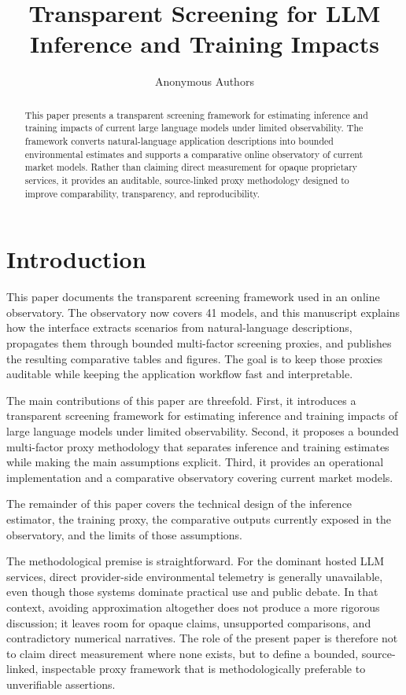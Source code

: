 \documentclass[runningheads]{llncs}
\title{Transparent Screening for LLM Inference and Training Impacts}
\author{Anonymous Authors}
\institute{}
\begin{document}
\maketitle

\begin{abstract}
This paper presents a transparent screening framework for estimating inference and training impacts of current large language models under limited observability. The framework converts natural-language application descriptions into bounded environmental estimates and supports a comparative online observatory of current market models. Rather than claiming direct measurement for opaque proprietary services, it provides an auditable, source-linked proxy methodology designed to improve comparability, transparency, and reproducibility.

\end{abstract}

\section{Introduction}
This paper documents the transparent screening framework used in an online observatory. The observatory now covers 41 models, and this manuscript explains how the interface extracts scenarios from natural-language descriptions, propagates them through bounded multi-factor screening proxies, and publishes the resulting comparative tables and figures. The goal is to keep those proxies auditable while keeping the application workflow fast and interpretable.

The main contributions of this paper are threefold. First, it introduces a transparent screening framework for estimating inference and training impacts of large language models under limited observability. Second, it proposes a bounded multi-factor proxy methodology that separates inference and training estimates while making the main assumptions explicit. Third, it provides an operational implementation and a comparative observatory covering current market models.

The remainder of this paper covers the technical design of the inference estimator, the training proxy, the comparative outputs currently exposed in the observatory, and the limits of those assumptions.

The methodological premise is straightforward. For the dominant hosted LLM services, direct provider-side environmental telemetry is generally unavailable, even though those systems dominate practical use and public debate. In that context, avoiding approximation altogether does not produce a more rigorous discussion; it leaves room for opaque claims, unsupported comparisons, and contradictory numerical narratives. The role of the present paper is therefore not to claim direct measurement where none exists, but to define a bounded, source-linked, inspectable proxy framework that is methodologically preferable to unverifiable assertions.
\end{document}
